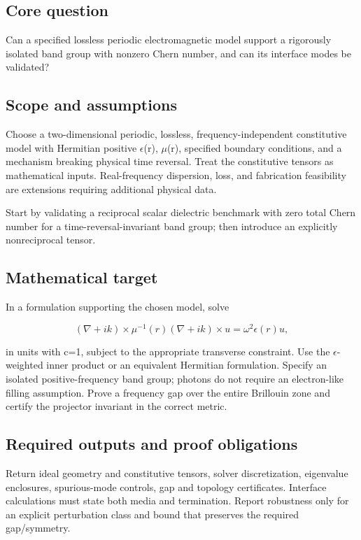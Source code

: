 \documentclass[
  11pt,
]{article}
\begin{document}
\subsection{Core question}

Can a specified lossless periodic electromagnetic model support a
rigorously isolated band group with nonzero Chern number, and can its
interface modes be validated?

\subsection{Scope and assumptions}

Choose a two-dimensional periodic, lossless, frequency-independent
constitutive model with Hermitian positive \ensuremath{\epsilon}(r),
\ensuremath{\mu}(r), specified boundary conditions, and a mechanism
breaking physical time reversal. Treat the constitutive tensors as
mathematical inputs. Real-frequency dispersion, loss, and fabrication
feasibility are extensions requiring additional physical data.

Start by validating a reciprocal scalar dielectric benchmark with zero
total Chern number for a time-reversal-invariant band group; then
introduce an explicitly nonreciprocal tensor.

\subsection{Mathematical target}

In a formulation supporting the chosen model, solve

\[(\nabla +ik)\times \mu ^{-1}(r)(\nabla +ik)\times u=\omega ^{2}\epsilon (r)u,\]

in units with c=1, subject to the appropriate transverse constraint. Use
the \ensuremath{\epsilon}-weighted inner product or an equivalent
Hermitian formulation. Specify an isolated positive-frequency band
group; photons do not require an electron-like filling assumption. Prove
a frequency gap over the entire Brillouin zone and certify the projector
invariant in the correct metric.

\subsection{Required outputs and proof obligations}

Return ideal geometry and constitutive tensors, solver discretization,
eigenvalue enclosures, spurious-mode controls, gap and topology
certificates. Interface calculations must state both media and
termination. Report robustness only for an explicit perturbation class
and bound that preserves the required gap/symmetry.
\end{document}
